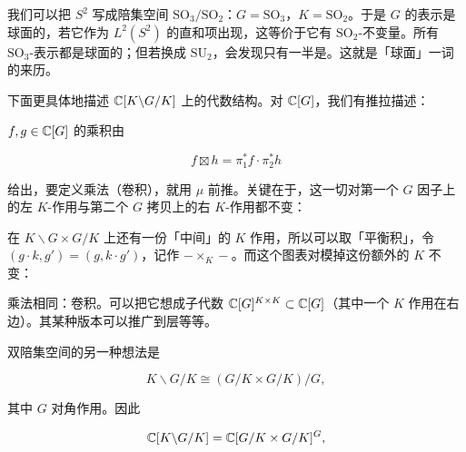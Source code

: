 
我们可以把 $S^2$ 写成陪集空间 $\mathrm{SO}_3/\mathrm{SO}_2$：$G=\mathrm{SO}_3$，$K=\mathrm{SO}_2$。于是 $G$ 的表示是球面的，若它作为 $L^2(S^2)$ 的直和项出现，这等价于它有 $\mathrm{SO}_2$-不变量。所有 $\mathrm{SO}_3$-表示都是球面的；但若换成 $\mathrm{SU}_2$，会发现只有一半是。这就是「球面」一词的来历。

下面更具体地描述 $\mathbb{C}[K\backslash G/K]$ 上的代数结构。对 $\mathbb{C}[G]$，我们有推拉描述：


$f,g\in\mathbb{C}[G]$ 的乘积由

\[f\boxtimes h=\pi_1^*f\cdot \pi_2^*h\]

给出，要定义乘法（卷积），就用 $\mu$ 前推。关键在于，这一切对第一个 $G$ 因子上的左 $K$-作用与第二个 $G$ 拷贝上的右 $K$-作用都不变：


在 $K\backslash G\times G/K$ 上还有一份「中间」的 $K$ 作用，所以可以取「平衡积」，令 $(g\cdot k,g')=(g,k\cdot g')$，记作 $-\times_K-$。而这个图表对模掉这份额外的 $K$ 不变：


乘法相同：卷积。可以把它想成子代数 $\mathbb{C}[G]^{K\times K}\subset\mathbb{C}[G]$（其中一个 $K$ 作用在右边）。其某种版本可以推广到层等等。

双陪集空间的另一种想法是

\[K\backslash G/K\cong (G/K\times G/K)/G,\]

其中 $G$ 对角作用。因此

\[\mathbb{C}[K\backslash G/K]=\mathbb{C}[G/K\times G/K]^G,\]

